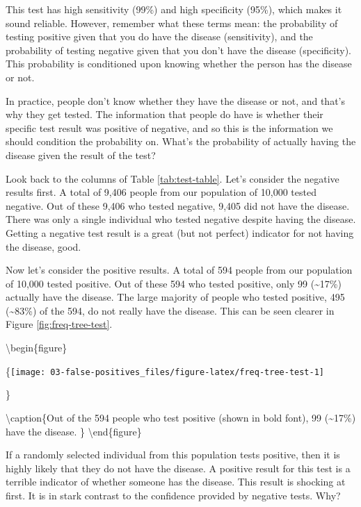 \documentclass[
]{book}
\begin{document}
This test has high sensitivity (99\%) and high specificity (95\%), which makes it sound reliable. However, remember what these terms mean: the probability of testing positive given that you do have the disease (sensitivity), and the probability of testing negative given that you don't have the disease (specificity). This probability is conditioned upon knowing whether the person has the disease or not.

In practice, people don't know whether they have the disease or not, and that's why they get tested. The information that people do have is whether their specific test result was positive of negative, and so this is the information we should condition the probability on. What's the probability of actually having the disease given the result of the test?

Look back to the columns of Table \ref{tab:test-table}. Let's consider the negative results first. A total of 9,406 people from our population of 10,000 tested negative. Out of these 9,406 who tested negative, 9,405 did not have the disease. There was only a single individual who tested negative despite having the disease. Getting a negative test result is a great (but not perfect) indicator for not having the disease, good.

Now let's consider the positive results. A total of 594 people from our population of 10,000 tested positive. Out of these 594 who tested positive, only 99 (\textasciitilde17\%) actually have the disease. The large majority of people who tested positive, 495 (\textasciitilde83\%) of the 594, do not really have the disease. This can be seen clearer in Figure \ref{fig:freq-tree-test}.

\textbackslash begin\{figure\}

\{\centering \texttt{[image: 03-false-positives\_files/figure-latex/freq-tree-test-1]}

\}

\textbackslash caption\{Out of the 594 people who test positive (shown in bold font), 99 (\textasciitilde17\%) have the disease. \}\label{fig:freq-tree-test}
\textbackslash end\{figure\}

If a randomly selected individual from this population tests positive, then it is highly likely that they do not have the disease. A positive result for this test is a terrible indicator of whether someone has the disease. This result is shocking at first. It is in stark contrast to the confidence provided by negative tests. Why?
\end{document}
